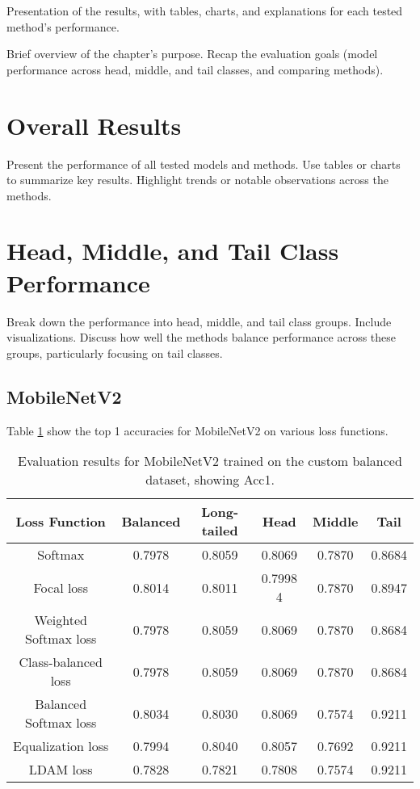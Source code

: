 
Presentation of the results, with tables, charts, and explanations for each tested method's performance.

Brief overview of the chapter’s purpose.
Recap the evaluation goals (model performance across head, middle, and tail classes, and comparing methods).

\section{Overall Results}
Present the performance of all tested models and methods.
Use tables or charts to summarize key results.
Highlight trends or notable observations across the methods.

\section{Head, Middle, and Tail Class Performance}
Break down the performance into head, middle, and tail class groups.
Include visualizations.
Discuss how well the methods balance performance across these groups, particularly focusing on tail classes.

\subsection{MobileNetV2}
Table \ref{tab:mobilenet_bal_acc1_1} show the top 1 accuracies for MobileNetV2 on various loss functions.

\begin{table}[H]
    \centering
    \begin{tabular}{cccccc}
        \toprule
        Loss Function & Balanced & Long-tailed & Head & Middle & Tail \\ 
        \midrule
        Softmax   & 0.7978   & 0.8059 & 0.8069 & 0.7870 & 0.8684 \\
        Focal loss   & 0.8014   & 0.8011 & 0.7998 4 & 0.7870 & 0.8947 \\
        Weighted Softmax loss   & 0.7978   & 0.8059 & 0.8069 & 0.7870 & 0.8684 \\
        Class-balanced loss   & 0.7978   & 0.8059 & 0.8069 & 0.7870 & 0.8684 \\
        Balanced Softmax loss   & 0.8034  & 0.8030 & 0.8069 & 0.7574 & 0.9211 \\
        Equalization loss   & 0.7994   & 0.8040 & 0.8057 & 0.7692 & 0.9211 \\
        LDAM loss   &  0.7828   & 0.7821 & 0.7808 & 0.7574 & 0.9211 \\
        \bottomrule
    \end{tabular}
    \caption{Evaluation results for MobileNetV2 trained on the custom balanced dataset, showing Acc1.}
    \label{tab:mobilenet_bal_acc1_1}
\end{table}

